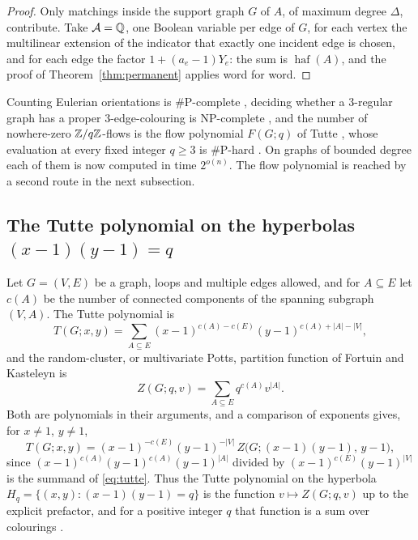 \begin{proof}
Only matchings inside the support graph $G$ of $A$, of maximum degree $\Delta$,
contribute. Take $\mathcal{A}=\mathbb{Q}$, one Boolean variable per edge of $G$, for each vertex
the multilinear extension of the indicator that exactly one incident edge is
chosen, and for each edge the factor $1+(a_e-1)Y_e$: the sum is
$\operatorname{haf}(A)$, and the proof of Theorem~\ref{thm:permanent} applies
word for word.
\end{proof}

\begin{remark}
Counting Eulerian orientations is $\#$P-complete \cite{MW96}, deciding whether a
$3$-regular graph has a proper $3$-edge-colouring is NP-complete \cite{Hol81},
and the number of nowhere-zero $\mathbb{Z}/q\mathbb{Z}$-flows is the flow polynomial $F(G;q)$ of
Tutte \cite{Tut54}, whose evaluation at every fixed integer $q\ge3$ is
$\#$P-hard \cite{JVW90}. On graphs of bounded degree each of them is now
computed in time $2^{o(n)}$. The flow polynomial is reached by a second route in
the next subsection.
\end{remark}

\subsection{The Tutte polynomial on the hyperbolas $(x-1)(y-1)=q$}\label{ssec:tutte}
Let $G=(V,E)$ be a graph, loops and multiple edges allowed, and for $A\subseteq E$
let $c(A)$ be the number of connected components of the spanning subgraph
$(V,A)$. The Tutte polynomial is
\begin{equation}\label{eq:tutte}
  T(G;x,y)=\sum_{A\subseteq E}(x-1)^{c(A)-c(E)}(y-1)^{c(A)+|A|-|V|},
\end{equation}
and the random-cluster, or multivariate Potts, partition function of
Fortuin and Kasteleyn \cite{FK72} is
\begin{equation}\label{eq:rc}
  Z(G;q,v)=\sum_{A\subseteq E}q^{c(A)}v^{|A|}.
\end{equation}
Both are polynomials in their arguments, and a comparison of exponents gives,
for $x\ne1$, $y\ne1$,
\begin{equation}\label{eq:tutterc}
  T(G;x,y)=(x-1)^{-c(E)}(y-1)^{-|V|}\,Z\bigl(G;(x-1)(y-1),\,y-1\bigr),
\end{equation}
since $(x-1)^{c(A)}(y-1)^{c(A)}(y-1)^{|A|}$ divided by $(x-1)^{c(E)}(y-1)^{|V|}$
is the summand of \eqref{eq:tutte}. Thus the Tutte polynomial on the hyperbola
$H_q=\{(x,y):(x-1)(y-1)=q\}$ is the function $v\mapsto Z(G;q,v)$ up to the
explicit prefactor, and for a positive integer $q$ that function is a sum over
colourings \cite{FK72,Sok05}.

